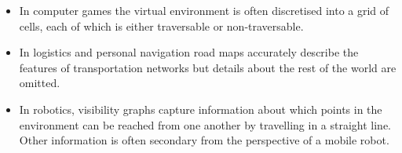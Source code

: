 \begin{itemize}
\item In computer games the virtual environment is often discretised into a grid of 
cells, each of which is either traversable or non-traversable. 
\item In logistics and personal navigation road maps accurately describe the
features of transportation networks but details about the rest of the world
are omitted.
\item In robotics,  visibility graphs capture information about which points
in the environment can be reached from one another by travelling in a straight line.
Other information is often secondary from the perspective of a mobile robot.
\end{itemize}
%
